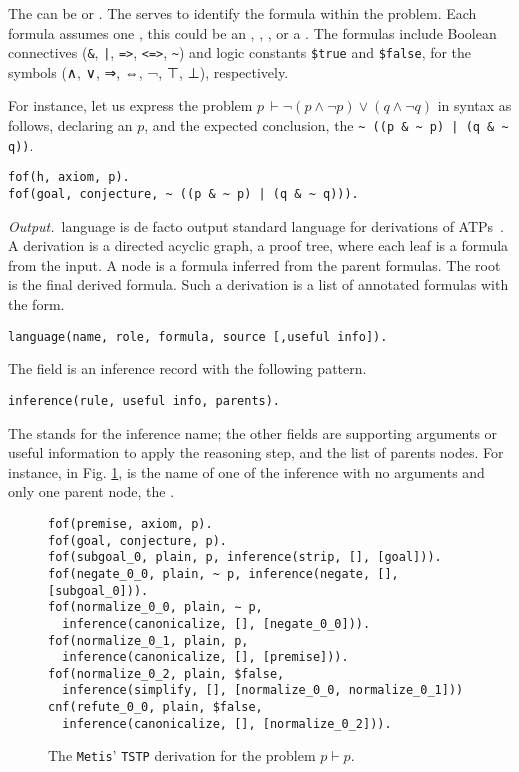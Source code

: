 \documentclass[../main.tex]{subfiles}
\begin{document}
The  can be  or . The 
serves to identify the formula within the problem. Each formula
assumes one , this could be an ,
, , or a .
The formulas include Boolean connectives (\verb!&!, \verb!|!,
\verb!=>!, \verb!<=>!, \verb!~!) and logic constants \verb!$true!
and \verb!$false!, for the symbols (∧, ∨, ⇒, ⇔, ¬, ⊤, ⊥), respectively.

For instance, let us express the problem
$p\, \vdash \neg (p \wedge \neg p) \vee (q \wedge \neg q)$
in \TPTP syntax as follows, declaring an \tptpaxiom $p$, and the
expected conclusion, the  \tptpconjecture
\verb!~ ((p & ~ p) | (q & ~ q))!.

\begin{verbatim}
fof(h, axiom, p).
fof(goal, conjecture, ~ ((p & ~ p) | (q & ~ q))).
\end{verbatim}

\textit{Output.}~\TSTP language is de facto output standard language
for derivations of ATPs~\cite{sutcliffe2004tstp}. A \TSTP derivation
is a directed acyclic graph, a proof tree, where each leaf is a
formula from the \TPTP input. A node is a formula inferred from the
parent formulas. The root is the final derived formula. Such a
derivation is a list of annotated formulas with the form.

\begin{verbatim}
language(name, role, formula, source [,useful info]).
\end{verbatim}

The  field is an inference record with the following
pattern.

\begin{verbatim}
inference(rule, useful info, parents).
\end{verbatim}

The  stands for the inference name; the other fields are
supporting arguments or useful information to apply the reasoning
step, and the list of parents nodes. For instance, in Fig.
\ref{fig:metis-proof-tstp}, \strip is the name of one of the
inference with no arguments and only one parent node, the
.

\begin{figure}
\begin{verbatim}
fof(premise, axiom, p).
fof(goal, conjecture, p).
fof(subgoal_0, plain, p, inference(strip, [], [goal])).
fof(negate_0_0, plain, ~ p, inference(negate, [], [subgoal_0])).
fof(normalize_0_0, plain, ∼ p,
  inference(canonicalize, [], [negate_0_0])).
fof(normalize_0_1, plain, p,
  inference(canonicalize, [], [premise])).
fof(normalize_0_2, plain, $false,
  inference(simplify, [], [normalize_0_0, normalize_0_1]))
cnf(refute_0_0, plain, $false,
  inference(canonicalize, [], [normalize_0_2])).
\end{verbatim}
\caption{The \texttt{Metis}' \texttt{TSTP} derivation for the
problem $p\vdash p$.}
\label{fig:metis-proof-tstp}
\end{figure}
\end{document}
